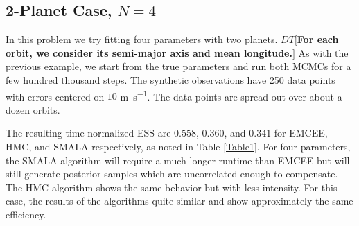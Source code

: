 \documentclass{aa}
\def\memodt#1{\color{green}$DT[${\bf #1}$]$ \color{black}}
\begin{document}
\begin{table}
\caption{MCMC Efficiency Results}             %
\label{Table1}      %
\centering                         
{}
\end{table}

\subsection{2-Planet Case, $N=4$}\label{n4section}

In this problem we try fitting four parameters with two planets.
\memodt{For each orbit, we consider its semi-major axis and mean longitude.}
As with the previous example, we start from the true parameters and run both MCMCs for a few hundred thousand steps. 
The synthetic observations have 250 data points with errors centered on $10$ \si{\metre\per\second}. 
The data points are spread out over about a dozen orbits.

The resulting time normalized ESS are $0.558$, $0.360$, and $0.341$ for EMCEE, HMC, and SMALA respectively, as noted in Table \ref{Table1}. 
For four parameters, the SMALA algorithm will require a much longer runtime than EMCEE but will still generate posterior samples which are uncorrelated enough to compensate. 
The HMC algorithm shows the same behavior but with less intensity. For this case, the results of the algorithms quite similar and show approximately the same efficiency.
\end{document}
